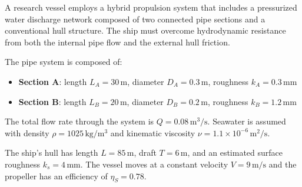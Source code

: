 \documentclass[12pt,a4paper]{article}
\begin{document}
 A research vessel employs a hybrid propulsion system that includes a pressurized water discharge network composed of two connected pipe sections and a conventional hull structure. The ship must overcome hydrodynamic resistance from both the internal pipe flow and the external hull friction.

The pipe system is composed of:
\begin{itemize}
    \item \textbf{Section A}: length $L_A = 30\,\mathrm{m}$, diameter $D_A = 0.3\,\mathrm{m}$, roughness $k_A = 0.3\,\mathrm{mm}$
    \item \textbf{Section B}: length $L_B = 20\,\mathrm{m}$, diameter $D_B = 0.2\,\mathrm{m}$, roughness $k_B = 1.2\,\mathrm{mm}$
\end{itemize}

The total flow rate through the system is $Q = 0.08\,\mathrm{m^3/s}$. Seawater is assumed with density $\rho = 1025\,\mathrm{kg/m^3}$ and kinematic viscosity $\nu = 1.1 \times 10^{-6}\,\mathrm{m^2/s}$.

The ship's hull has length $L = 85\,\mathrm{m}$, draft $T = 6\,\mathrm{m}$, and an estimated surface roughness $k_s = 4\,\mathrm{mm}$. The vessel moves at a constant velocity $V = 9\,\mathrm{m/s}$ and the propeller has an efficiency of $\eta_S = 0.78$.
\end{document}
